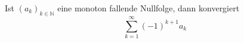 Ist $(a_k)_{k \in \mathbb{N}}$ eine monoton fallende Nullfolge, dann konvergiert
$$\sum_{k=1}^\infty (-1)^{k+1} a_k$$